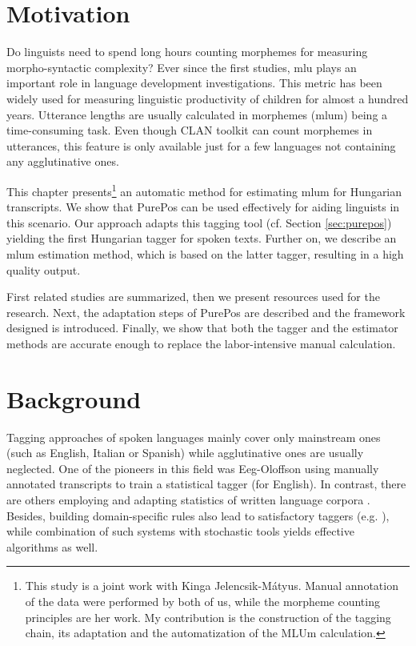 
\section{Motivation}

Do linguists need to spend long hours counting morphemes for measuring morpho-syntactic complexity? 
Ever since the first studies, \gls{mlu} plays an important role in language development investigations. 
This metric has been widely used for measuring linguistic productivity of children for almost a hundred years. 
Utterance lengths are usually calculated in morphemes (\acrshort{mlum}) being a time-consuming task. 
Even though CLAN toolkit \cite{MacWhinney1992} can count morphemes in utterances, this feature is only available just for a few languages not containing any agglutinative ones. %

This chapter presents\footnote{This study is a joint work with Kinga Jelencsik-Mátyus. 
Manual annotation of the data were performed by both of us, while the morpheme counting principles are her work. 
My contribution is the construction of the tagging chain, its adaptation and the automatization of the MLUm calculation.} 
an automatic method for estimating \acrshort{mlum} for Hungarian transcripts. 
We show that PurePos can be used effectively for aiding linguists in this scenario. 
Our approach adapts this tagging tool (cf. Section \ref{sec:purepos}) yielding the first Hungarian tagger for spoken texts. 
Further on, we describe an \acrshort{mlum} estimation method, which is based on the latter tagger, resulting in a high quality output. 

First related studies are summarized, then we present resources used for the research. 
Next, the adaptation steps of PurePos are described and the framework designed is introduced. 
Finally, we show that both the tagger and the estimator methods are accurate enough to replace the labor-intensive manual calculation.

\section{Background}

Tagging approaches of spoken languages mainly cover only mainstream ones (such as English, Italian or Spanish) while agglutinative ones are usually neglected. 
One of the pioneers in this field was Eeg-Oloffson \cite{Svartvik1982} using  manually annotated transcripts to train a statistical tagger (for English). 
In contrast, there are others employing and adapting statistics of written language corpora \cite{Mendes2004,Nivre1996,Panunzi2004}.
Besides, building domain-specific rules also lead to satisfactory taggers (e.g. \cite{Moreno2003}),
while combination of such systems with stochastic tools \cite{Bick2012} yields effective algorithms as well. 

